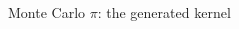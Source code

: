 \documentclass[@BEAMER_OPTIONS@]{beamer}
\begin{document}

\begin{frame}[fragile]{Monte Carlo $\pi$: the generated kernel}
    \begin{columns}
        \begin{column}[t]{0.2\textwidth}
            \begin{exampleblock}{}
                \begin{adjustbox}{width=0.30\textwidth, height=\textheight, keepaspectratio}
                    \begin{minipage}{\textwidth}
                        
                    \end{minipage}
                \end{adjustbox}
            \end{exampleblock}
        \end{column}
        \begin{column}[t]{0.2\textwidth}
            \begin{exampleblock}{}
                \begin{adjustbox}{width=0.30\textwidth, height=\textheight, keepaspectratio}
                    \begin{minipage}{\textwidth}
                        
                    \end{minipage}
                \end{adjustbox}
            \end{exampleblock}
        \end{column}
        \begin{column}[t]{0.2\textwidth}
            \begin{exampleblock}{}
                \begin{adjustbox}{width=0.30\textwidth, height=\textheight, keepaspectratio}
                    \begin{minipage}{\textwidth}
                        
                    \end{minipage}

\end{adjustbox}
\end{exampleblock}
\end{column}
\end{columns}
\end{frame}
\end{document}
